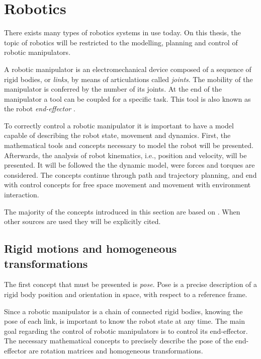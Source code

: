 


\section{Robotics}
\label{sec:robotics}

There exists many types of robotics systems in use today. On this thesis, the topic of robotics will be restricted to the modelling, planning and control of robotic manipulators.

A robotic manipulator is an electromechanical device composed of a sequence of rigid bodies, or \emph{links}, by means of articulations called \emph{joints}. The mobility of the manipulator is conferred by the number of its joints. At the end of the manipulator a tool can be coupled for a specific task. This tool is also known as the robot \emph{end-effector} \cite{Siciliano2009_robotics_modelling_planning_control}.

To correctly control a robotic manipulator it is important to have a model capable of describing the robot state, movement and dynamics. First, the mathematical tools and concepts necessary to model the robot will be presented. Afterwards, the analysis of robot kinematics, i.e., position and velocity, will be presented. It will be followed the the dynamic model, were forces and torques are considered. The concepts continue through path and trajectory planning, and end with control concepts for free space movement and movement with environment interaction.

The majority of the concepts introduced in this section are based on \cite{Siciliano2009_robotics_modelling_planning_control}. When other sources are used they will be explicitly cited.

\subsection{Rigid motions and homogeneous transformations}
\label{subsec:rigid_motions_homogeneous_transformations}

The first concept that must be presented is \emph{pose}. Pose is a precise description of a rigid body position and orientation in space, with respect to a reference frame.  

Since a robotic manipulator is a chain of connected rigid bodies, knowing the pose of each link, is important to know the robot state at any time. The main goal regarding the control of robotic manipulators is to control its end-effector. The necessary mathematical concepts to precisely describe the pose of the end-effector are rotation matrices and homogeneous transformations.

